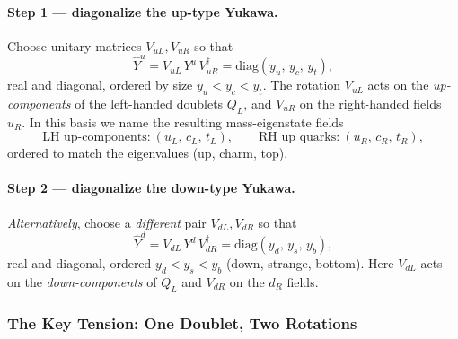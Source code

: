 \paragraph{Step 1 --- diagonalize the up-type Yukawa.}
Choose unitary matrices $V_{uL}, V_{uR}$ so that
\begin{equation}
  \hat Y^u = V_{uL}\,Y^u\,V_{uR}^\dagger
           = \mathrm{diag}(y_u,\,y_c,\,y_t),
  \label{eq:lec20:yu-diag}
\end{equation}
real and diagonal, ordered by size $y_u<y_c<y_t$. The rotation
$V_{uL}$ acts on the \emph{up-components} of the left-handed doublets
$Q_L$, and $V_{uR}$ on the right-handed fields $u_R$. In this basis we
name the resulting mass-eigenstate fields
\begin{equation*}
  \text{LH up-components:}\ (u_L,\,c_L,\,t_L),
  \qquad
  \text{RH up quarks:}\ (u_R,\,c_R,\,t_R),
\end{equation*}
ordered to match the eigenvalues (up, charm, top).

\paragraph{Step 2 --- diagonalize the down-type Yukawa.}
\emph{Alternatively}, choose a \emph{different} pair $V_{dL}, V_{dR}$ so
that
\begin{equation}
  \hat Y^d = V_{dL}\,Y^d\,V_{dR}^\dagger
           = \mathrm{diag}(y_d,\,y_s,\,y_b),
  \label{eq:lec20:yd-diag}
\end{equation}
real and diagonal, ordered $y_d<y_s<y_b$ (down, strange, bottom). Here
$V_{dL}$ acts on the \emph{down-components} of $Q_L$ and $V_{dR}$ on the
$d_R$ fields.

\subsubsection*{The Key Tension: One Doublet, Two Rotations}

